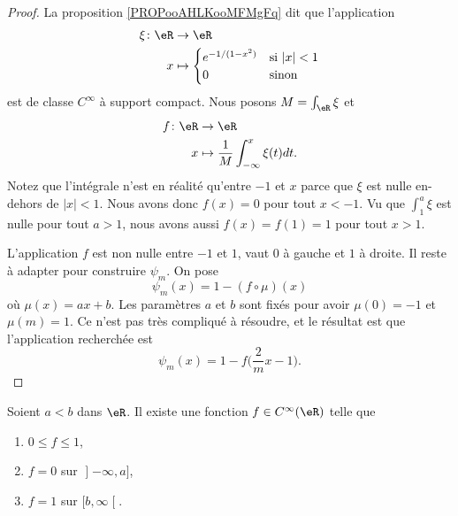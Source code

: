 \begin{proof}
	La proposition \ref{PROPooAHLKooMFMgFq} dit que l'application
	\begin{equation}
		\begin{aligned}
			\xi\colon \eR & \to \eR                                     \\
			x             & \mapsto \begin{cases}
				                        e^{-1/(1-x^2)} & \text{si } | x |<1 \\
				                        0              & \text{sinon }
			                        \end{cases}
		\end{aligned}
	\end{equation}
	est de classe \( C^{\infty}\) à support compact. Nous posons \( M=\int_{\eR}\xi\) et
	\begin{equation}
		\begin{aligned}
			f\colon \eR & \to \eR                                       \\
			x           & \mapsto \frac{1}{ M}\int_{-\infty}^x\xi(t)dt.
		\end{aligned}
	\end{equation}
	Notez que l'intégrale n'est en réalité qu'entre \( -1\) et \( x\) parce que \( \xi\) est nulle en-dehors de \( | x |<1\). Nous avons donc \( f(x)=0\) pour tout \( x<-1\). Vu que \( \int_{1}^a\xi\) est nulle pour tout \( a>1\), nous avons aussi \( f(x)=f(1)=1\) pour tout \( x>1\).

	L'application \( f\) est non nulle entre \( -1\) et \( 1\), vaut \( 0\) à gauche et \( 1\) à droite. Il reste à adapter pour construire \( \psi_m\). On pose
	\begin{equation}
		\psi_m(x)=1-(f\circ\mu)(x)
	\end{equation}
	où \( \mu(x)=ax+b\). Les paramètres \( a\) et \( b\) sont fixés pour avoir \( \mu(0)=-1\) et \( \mu(m)=1\). Ce n'est pas très compliqué à résoudre, et le résultat est que l'application recherchée est
	\begin{equation}
		\psi_m(x)=1-f\big( \frac{ 2 }{ m }x-1 \big).
	\end{equation}
\end{proof}



\begin{lemma}     \label{LEMooFFPVooDKGUAp}
	Soient \( a<b\) dans \( \eR\). Il existe une fonction \( f\in  C^{\infty}(\eR)\) telle que
	\begin{enumerate}
		\item
		      \( 0\leq f\leq 1\),
		\item
		      \( f=0\) sur \( \mathopen] -\infty , a \mathclose]\),
		\item
		      \( f=1\) sur \( \mathopen[ b , \infty \mathclose[\).
	\end{enumerate}
\end{lemma}

